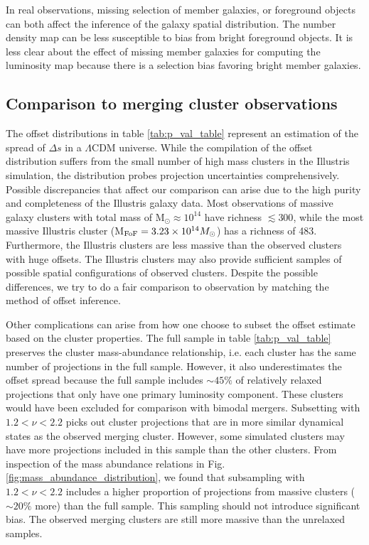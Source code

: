 In real observations, missing selection of member galaxies, or 
foreground objects can both affect the inference of the galaxy spatial 
distribution. The number density map can be less susceptible to bias from bright 
foreground objects. It is less clear about the effect of missing member galaxies 
for computing the luminosity map because there is a selection bias favoring 
bright member galaxies.

\subsection{Comparison to merging cluster observations}

The offset distributions in table \ref{tab:p_val_table}
represent an estimation of the spread of $\Delta s$ in a $\Lambda$CDM universe.
While the compilation of the offset distribution suffers 
from the small number of high mass clusters in the Illustris simulation, 
the distribution probes projection uncertainties comprehensively. 
Possible discrepancies that affect our comparison can arise
due to the high purity and completeness of the Illustris galaxy data.
Most observations of massive galaxy clusters with total mass of M$_\odot
\approx 10^{14}$ have richness $\lesssim 300$, while the most massive Illustris
cluster (M$_{\rm FoF} = 3.23 \times 10^{14} M_\odot$) has a richness of 483.
Furthermore, the Illustris clusters are less massive than the observed clusters
with huge offsets. The Illustris clusters may also provide sufficient samples
of possible spatial configurations of observed clusters.
Despite the possible differences, we try to do a
fair comparison to observation by matching the method of offset inference. 

Other complications can arise from how one choose to subset the offset estimate
based on the cluster properties.
The full sample in table \ref{tab:p_val_table} preserves the cluster mass-abundance
relationship, i.e. each cluster has the same number of projections in
the full sample. However, it also underestimates the offset spread because the
full sample includes $\sim 45\%$ of relatively relaxed projections 
that only have one primary luminosity component.  These clusters would
have been excluded for comparison with bimodal mergers. 
Subsetting with $1.2 < \nu < 2.2$ picks out
cluster projections that are in more similar dynamical states as the observed merging
cluster. 
However, some simulated clusters may have more projections included in this sample
than the other clusters. From inspection of the mass abundance relations in 
Fig. \ref{fig:mass_abundance_distribution}, we found that subsampling with $1.2 <
\nu <2.2$ includes a higher proportion of projections from massive clusters
($\sim 20\%$ more) than 
the full sample. This sampling should not introduce significant bias. 
The observed merging clusters are still more massive than the unrelaxed samples. 

